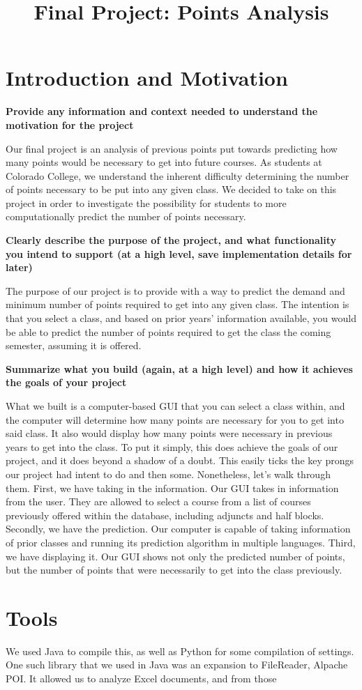 \documentclass{article}
\begin{document}
    \title{Final Project: Points Analysis}
    \maketitle
    \section{Introduction and Motivation}
    \textbf{\checkmark Provide any information and context needed to understand the motivation for the project}

    Our final project is an analysis of previous points put towards predicting how many points would be necessary to get into future courses. As students at Colorado College, we understand the inherent difficulty determining the number of points necessary to be put into any given class. We decided to take on this project in order to investigate the possibility for students to more computationally predict the number of points necessary.

    \par
    \textbf{\checkmark Clearly describe the purpose of the project, and what functionality you intend to support (at a high level, save implementation details for later)}

    The purpose of our project is to provide with a way to predict the demand and minimum number of points required to get into any given class. The intention is that you select a class, and based on prior years' information available, you would be able to predict the number of points required to get the class the coming semester, assuming it is offered.

    \par
    \textbf{Summarize what you build (again, at a high level) and how it achieves the goals of your project}

    What we built is a computer-based GUI that you can select a class within, and the computer will determine how many points are necessary for you to get into said class. It also would display how many points were necessary in previous years to get into the class. To put it simply, this does achieve the goals of our project, and it does beyond a shadow of a doubt. This easily ticks the key prongs our project had intent to do and then some. Nonetheless, let's walk through them. First, we have taking in the information. Our GUI takes in information from the user. They are allowed to select a course from a list of courses previously offered within the database, including adjuncts and half blocks. Secondly, we have the prediction. Our computer is capable of taking information of prior classes and running its prediction algorithm in multiple languages. Third, we have displaying it. Our GUI shows not only the predicted number of points, but the number of points that were necessarily to get into the class previously.



    \section{Tools}
    We used Java to compile this, as well as Python for some compilation of settings. One such library that we used in Java was an expansion to FileReader, Alpache POI. It allowed us to analyze Excel documents, and from those
\end{document}
